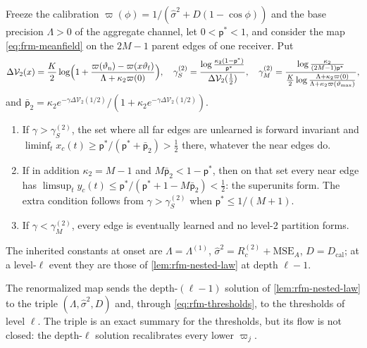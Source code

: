\begin{theorem}\label{thm:rfm-thresholds}
Freeze the calibration $\varpi(\phi)=1/(\hat\sigma^2+D(1-\cos\phi))$ and the base precision $\Lambda>0$ of the aggregate channel, let $0<\mathsf p^\ast<1$, and consider the map \eqref{eq:frm-meanfield} on the $2M-1$ parent edges of one receiver. Put
\begin{equation}\label{eq:rfm-thresholds}
\Delta\mathcal V_2(x)=\frac K2\log\Bigl(1+\frac{\varpi(\vartheta_{\mathrm n})-\varpi(x\vartheta_{\mathrm f})}{\Lambda+\kappa_2\varpi(0)}\Bigr),\quad\gamma_S^{(2)}=\frac{\log\frac{\kappa_2(1-\mathsf p^\ast)}{\mathsf p^\ast}}{\Delta\mathcal V_2(\frac12)},\quad\gamma_M^{(2)}=\frac{\log\frac{\kappa_2}{(2M-1)\mathsf p^\ast}}{\frac K2\log\frac{\Lambda+\kappa_2\varpi(0)}{\Lambda+\kappa_2\varpi(\vartheta_{\max})}},
\end{equation}
and $\bar{\mathsf p}_2=\kappa_2e^{-\gamma\Delta\mathcal V_2(1/2)}/(1+\kappa_2e^{-\gamma\Delta\mathcal V_2(1/2)})$.
\begin{enumerate}
\item[(a)] If $\gamma>\gamma_S^{(2)}$, the set where all far edges are unlearned is forward invariant and $\liminf_tx_c(t)\ge\mathsf p^\ast/(\mathsf p^\ast+\bar{\mathsf p}_2)>\frac12$ there, whatever the near edges do.
\item[(b)] If in addition $\kappa_2=M-1$ and $M\bar{\mathsf p}_2<1-\mathsf p^\ast$, then on that set every near edge has $\limsup_ty_c(t)\le\mathsf p^\ast/(\mathsf p^\ast+1-M\bar{\mathsf p}_2)<\frac12$: the superunits form. The extra condition follows from $\gamma>\gamma_S^{(2)}$ when $\mathsf p^\ast\le1/(M+1)$.
\item[(c)] If $\gamma<\gamma_M^{(2)}$, every edge is eventually learned and no level-2 partition forms.
\end{enumerate}
The inherited constants at onset are $\Lambda=\Lambda^{(1)}$, $\hat\sigma^2=R_c^{(2)}+\mathrm{MSE}_A$, $D=D_{\mathrm{cal}}$; at a level-$\ell$ event they are those of \cref{lem:rfm-nested-law} at depth $\ell-1$.
\end{theorem}

The renormalized map sends the depth-$(\ell-1)$ solution of \cref{lem:rfm-nested-law} to the triple $(\Lambda,\hat\sigma^2,D)$ and, through \eqref{eq:rfm-thresholds}, to the thresholds of level $\ell$. The triple is an exact summary for the thresholds, but its flow is not closed: the depth-$\ell$ solution recalibrates every lower $\varpi_j$.


